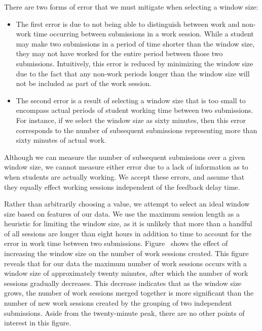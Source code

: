 There are two forms of error that we must mitigate when selecting a window
size:

\begin{itemize}
\item The first error is due to not being able to distinguish between work and
  non-work time occurring between submissions in a work session. While a
  student may make two submissions in a period of time shorter than the window
  size, they may not have worked for the entire period between those two
  submissions. Intuitively, this error is reduced by minimizing the window size
  due to the fact that any non-work periods longer than the window size will
  not be included as part of the work session.
\item The second error is a result of selecting a window size that is too small
  to encompass actual periods of student working time between two submissions.
  For instance, if we select the window size as sixty minutes, then this error
  corresponds to the number of subsequent submissions representing more than
  sixty minutes of actual work.
\end{itemize}

Although we can measure the number of subsequent submissions over a given
window size, we cannot measure either error due to a lack of information as to
when students are actually working. We accept these errors, and assume that
they equally effect working sessions independent of the feedback delay
time.

Rather than arbitrarily choosing a value, we attempt to select an ideal window
size based on features of our data. We use the maximum session length as a
heuristic for limiting the window size, as it is unlikely that more than a
handful of all sessions are longer than eight hours in addition to time to
account for the error in work time between two
submissions. Figure~ shows the effect of increasing
the window size on the number of work sessions created. This figure reveals
that for our data the maximum number of work sessions occurs with a window size
of approximately twenty minutes, after which the number of work sessions
gradually decreases. This decrease indicates that as the window size grows, the
number of work sessions merged together is more significant than the number of
new work sessions created by the grouping of two independent submissions. Aside
from the twenty-minute peak, there are no other points of interest in this
figure.

